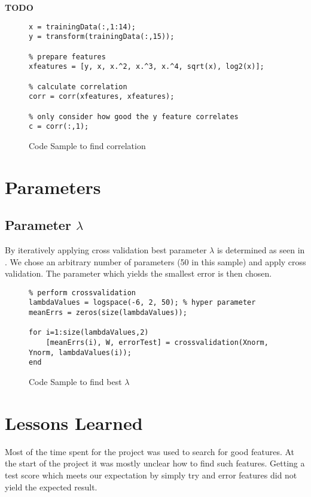 \documentclass[a4paper, 11pt]{article}
\begin{document}
\textbf{TODO}

\begin{figure}
\begin{center}
\begin{lstlisting} 
x = trainingData(:,1:14);
y = transform(trainingData(:,15));

% prepare features
xfeatures = [y, x, x.^2, x.^3, x.^4, sqrt(x), log2(x)];

% calculate correlation
corr = corr(xfeatures, xfeatures);

% only consider how good the y feature correlates
c = corr(:,1);
\end{lstlisting}
\end{center}
\caption{Code Sample to find correlation}
\label{lst:matlab-correlation}
\end{figure}



\section{Parameters}

\subsection{Parameter $\lambda$}

By iteratively applying cross validation best parameter $\lambda$ is determined as seen in . We chose an arbitrary number of parameters (50 in this sample) and apply cross validation. The parameter which yields the smallest error is then chosen.


\begin{figure}
\begin{center}
\begin{lstlisting} 
% perform crossvalidation
lambdaValues = logspace(-6, 2, 50); % hyper parameter
meanErrs = zeros(size(lambdaValues));

for i=1:size(lambdaValues,2)
    [meanErrs(i), W, errorTest] = crossvalidation(Xnorm, Ynorm, lambdaValues(i));
end
\end{lstlisting}
\end{center}
\caption{Code Sample to find best $\lambda$}
\label{lst:matlab-crossvalidation}
\end{figure}

\section{Lessons Learned} 
Most of the time spent for the project was used to search for good features. At the start of the project  it was mostly unclear how to find such features. Getting a test score which meets our expectation by simply try and error features did not yield the expected result.
\end{document}

